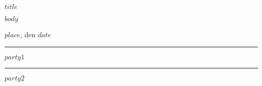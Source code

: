 \documentclass[parskip=half]{scrreprt}
\begin{document}
    \begin{center}
        \textbf{\LARGE{$title$}}
    \end{center}

    $body$

    $place$, den $date$

    \vspace{1.5cm}    
    \rule{0.9\textwidth}{1pt}\par
    $party1$
    \endminipage
    \rule{0.9\textwidth}{1pt}\par
    $party2$
    \endminipage
\end{document}
